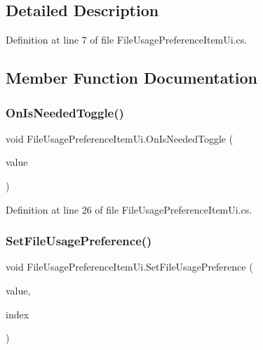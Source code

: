\subsection{Detailed Description}


Definition at line 7 of file File\+Usage\+Preference\+Item\+Ui.\+cs.



\subsection{Member Function Documentation}
\mbox{\label{class_file_usage_preference_item_ui_a80a460ca8c3f5138305bd5785152024a}} 
\subsubsection{\texorpdfstring{OnIsNeededToggle()}{OnIsNeededToggle()}}
{\footnotesize\ttfamily void File\+Usage\+Preference\+Item\+Ui.\+On\+Is\+Needed\+Toggle (\begin{DoxyParamCaption}\item[{bool}]{value }\end{DoxyParamCaption})}



Definition at line 26 of file File\+Usage\+Preference\+Item\+Ui.\+cs.

\mbox{\label{class_file_usage_preference_item_ui_ac8e29452cd2b12b088417ff1e23d3e33}} 
\subsubsection{\texorpdfstring{SetFileUsagePreference()}{SetFileUsagePreference()}}
{\footnotesize\ttfamily void File\+Usage\+Preference\+Item\+Ui.\+Set\+File\+Usage\+Preference (\begin{DoxyParamCaption}\item[{\mbox{\hyperlink{class_file_usage_preference}{File\+Usage\+Preference}}}]{value,  }\item[{int}]{index }\end{DoxyParamCaption})}



